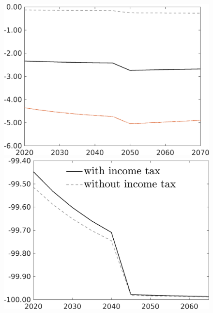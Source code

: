 \begin{figure}[h!!!]
\begin{minipage}[]{0.32\textwidth}
	\end{minipage}
	\begin{minipage}[]{0.32\textwidth}
		\includegraphics[width=1\textwidth]{../../codding_model/own_basedOnFried/optimalPol_010922_revision/figures/all_13Sept22_Tplus30/hl_PercentageLFDynNT_Target_regime0_spillover0_noskill0_sep0_xgrowth0_PV1_etaa0.79_lgd0.png}
	\end{minipage}
	\begin{minipage}[]{0.32\textwidth}
		\includegraphics[width=1\textwidth]{../../codding_model/own_basedOnFried/optimalPol_010922_revision/figures/all_13Sept22_Tplus30/gAf_PercentageLFDynNT_noeff_Target_regime0_spillover0_knspil0_noskill0_sep0_xgrowth0_PV1_etaa0.79_lgd1.png}

\end{minipage}
\end{figure}
